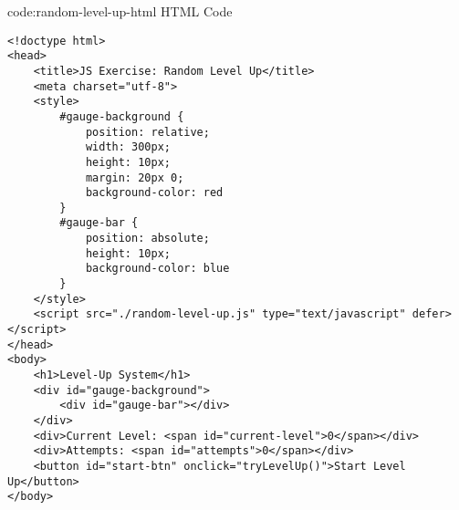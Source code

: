 \begin{codeenv}{code:random-level-up-html}{ HTML Code}
\begin{verbatim}
<!doctype html>
<head>
    <title>JS Exercise: Random Level Up</title>
    <meta charset="utf-8">
    <style>
        #gauge-background {
            position: relative;
            width: 300px;
            height: 10px;
            margin: 20px 0;
            background-color: red
        }
        #gauge-bar {
            position: absolute;
            height: 10px;
            background-color: blue
        }
    </style>
    <script src="./random-level-up.js" type="text/javascript" defer></script>
</head>
<body>
    <h1>Level-Up System</h1>
    <div id="gauge-background">
        <div id="gauge-bar"></div>
    </div>
    <div>Current Level: <span id="current-level">0</span></div>
    <div>Attempts: <span id="attempts">0</span></div>
    <button id="start-btn" onclick="tryLevelUp()">Start Level Up</button>
</body>
\end{verbatim}
\end{codeenv}

